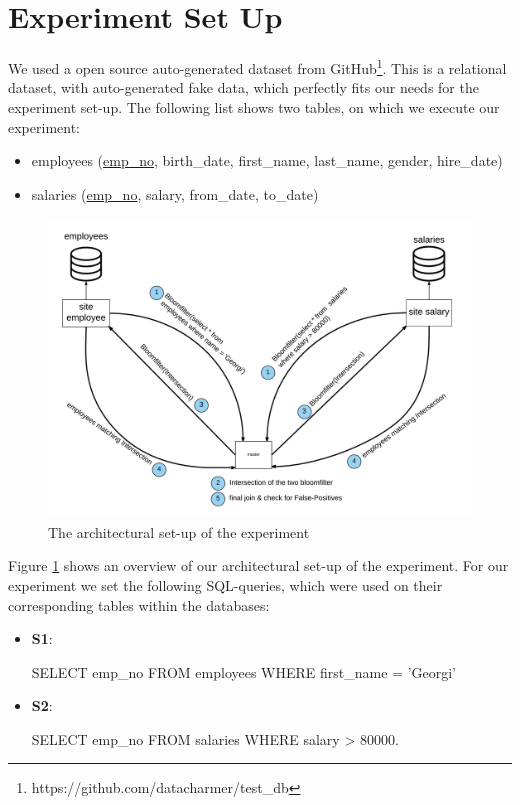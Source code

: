 \documentclass[12]{scrartcl}
\begin{document}
\section{Experiment Set Up}
We used a open source auto-generated dataset from GitHub\footnote{https://github.com/datacharmer/test\_db}. This is a relational dataset, with auto-generated fake data, which perfectly fits our needs for the experiment set-up. The following list shows two tables, on which we execute our experiment: 
\begin{itemize}
	\item employees (\uline{emp\_no}, birth\_date, first\_name, last\_name, gender, hire\_date)
	\item salaries (\uline{emp\_no}, salary, from\_date, to\_date)
\end{itemize}

\begin{figure}[ht]
	\begin{center}
		\includegraphics[scale=0.1]{res/architecture.png}
	\end{center}
	\caption{The architectural set-up of the experiment}
	\label{fig:architecture}
\end{figure}

Figure \ref{fig:architecture} shows an overview of our architectural set-up of the experiment. For our experiment we set the following SQL-queries, which were used on their corresponding tables within the databases:

\begin{itemize}
	\item  \textbf{S1}: \begin{verb}
	SELECT emp_no FROM employees WHERE first_name = 'Georgi'
	\end{verb}
\end{itemize}
\begin{itemize}
	\item  \textbf{S2}: \begin{verb}
		SELECT emp_no FROM salaries WHERE salary > 80000.
	\end{verb}
\end{itemize}
\end{document}

